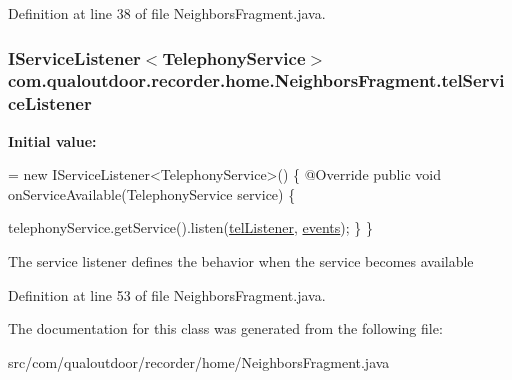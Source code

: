 Definition at line 38 of file Neighbors\-Fragment.\-java.

\hypertarget{classcom_1_1qualoutdoor_1_1recorder_1_1home_1_1NeighborsFragment_a8b5037922ec941ed326b0d74ce57e4c6}{
\subsubsection[{tel\-Service\-Listener}]{\setlength{\rightskip}{0pt plus 5cm}I\-Service\-Listener$<${\bf Telephony\-Service}$>$ com.\-qualoutdoor.\-recorder.\-home.\-Neighbors\-Fragment.\-tel\-Service\-Listener\hspace{0.3cm}{\ttfamily [private]}}}\label{classcom_1_1qualoutdoor_1_1recorder_1_1home_1_1NeighborsFragment_a8b5037922ec941ed326b0d74ce57e4c6}
{\bfseries Initial value\-:}
\begin{DoxyCode}
= \textcolor{keyword}{new} IServiceListener<TelephonyService>() \{
        @Override
        \textcolor{keyword}{public} \textcolor{keywordtype}{void} onServiceAvailable(TelephonyService service) \{
            
            telephonyService.getService().listen(\hyperlink{classcom_1_1qualoutdoor_1_1recorder_1_1home_1_1NeighborsFragment_ae1f6f2467a89a24ccbe71cd88ed425b7}{telListener}, \hyperlink{classcom_1_1qualoutdoor_1_1recorder_1_1home_1_1NeighborsFragment_a93d9c9e5a667b7404b65bee5e0015fe5}{events});
        \}
    \}
\end{DoxyCode}
The service listener defines the behavior when the service becomes available 

Definition at line 53 of file Neighbors\-Fragment.\-java.



The documentation for this class was generated from the following file\-:\begin{DoxyCompactItemize}
\item 
src/com/qualoutdoor/recorder/home/Neighbors\-Fragment.\-java\end{DoxyCompactItemize}
